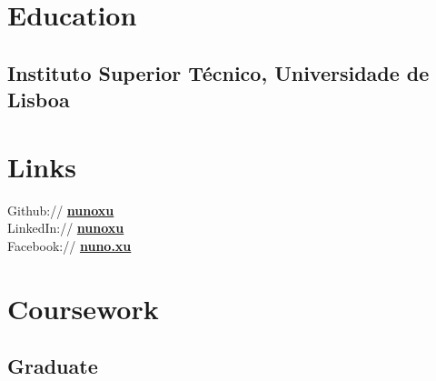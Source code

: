 \documentclass[letterpaper]{deedy-resume} %
\begin{document}
\begin{minipage}[t]{0.33\textwidth} %


\section{Education} 

\subsection{Instituto Superior Técnico, Universidade de Lisboa }


\sectionspace %


\sectionspace %



\section{Links} 

Github:// \href{https://github.com/nunoxu}{\bf nunoxu} \\
LinkedIn:// \href{https://www.linkedin.com/in/nunoxu}{\bf nunoxu}\\
Facebook:// \href{https://www.facebook.com/Nuno.Xu}{\bf nuno.xu}

\sectionspace %


\section{Coursework}

\subsection{Graduate}


\end{minipage}
\end{document}
